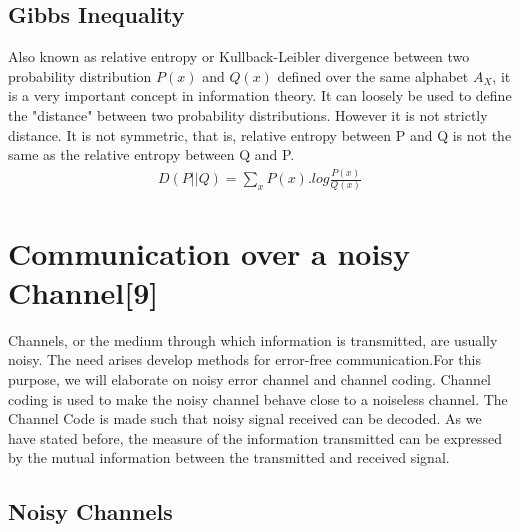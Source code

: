 \documentclass[10pt,twocolumn,letterpaper]{article}
\begin{document}
\subsection{Gibbs Inequality}
Also known as relative entropy or Kullback-Leibler divergence between two probability distribution $P(x)$ and $Q(x)$ defined over the same alphabet $A_X$, it is a very important concept in information theory. It can loosely be used to define the "distance" between two probability distributions. However it is not strictly distance. It is not symmetric, that is, relative entropy between P and Q is not the same as the relative entropy between Q and P.
\begin{eqnarray*}
    D(P||Q)=\sum_{x}P(x).log\frac{P(x)}{Q(x)}
\end{eqnarray*}


\section{Communication over a noisy Channel{\small[9]}}
Channels, or the medium through which information is transmitted, are usually noisy. The need arises develop methods for error-free communication.For this purpose, we will elaborate on noisy error channel and channel coding. Channel coding is used to make the noisy channel behave close to a noiseless channel. The Channel Code is made such that noisy signal received can be decoded. As we have stated before, the measure of the information  transmitted can be expressed by the mutual information between the transmitted and received signal.

\subsection{Noisy Channels}
\end{document}
